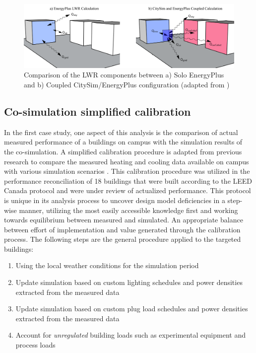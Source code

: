 \documentclass{tBPS2e}
\theoremstyle{plain}
\theoremstyle{definition}
\theoremstyle{remark}
\begin{document}
\begin{figure}[H]
  \centering
  \includegraphics[width=1.0\textwidth]{figures/LWRCalc_Combined_V3}
  \caption{Comparison of the LWR components between a) Solo EnergyPlus and b) Coupled CitySim/EnergyPlus configuration (adapted from \citep{Miller:2015vk})
  \label{combinedLWR}}
\end{figure}


\subsection{Co-simulation simplified calibration}
In the first case study, one aspect of this analysis is the comparison of actual measured performance of a buildings on campus with the simulation results of the co-simulation. A simplified calibration procedure is adapted from previous research to compare the measured heating and cooling data available on campus with various simulation scenarios \citep{Samuelson:2015jg}. This calibration procedure was utilized in the performance reconciliation of 18 buildings that were built according to the LEED Canada protocol and were under review of actualized performance. This protocol is unique in its analysis process to uncover design model deficiencies in a step-wise manner, utilizing the most easily accessible knowledge first and working towards equilibrium between measured and simulated. An appropriate balance between effort of implementation and value generated through the calibration process. The following steps are the general procedure applied to the targeted buildings:

\begin{enumerate}
  \item Using the local weather conditions for the simulation period
  \item Update simulation based on custom lighting schedules and power densities extracted from the measured data
  \item Update simulation based on custom plug load schedules and power densities extracted from the measured data
  \item Account for \emph{unregulated} building loads such as experimental equipment and process loads
\end{enumerate}
 
\end{document}
